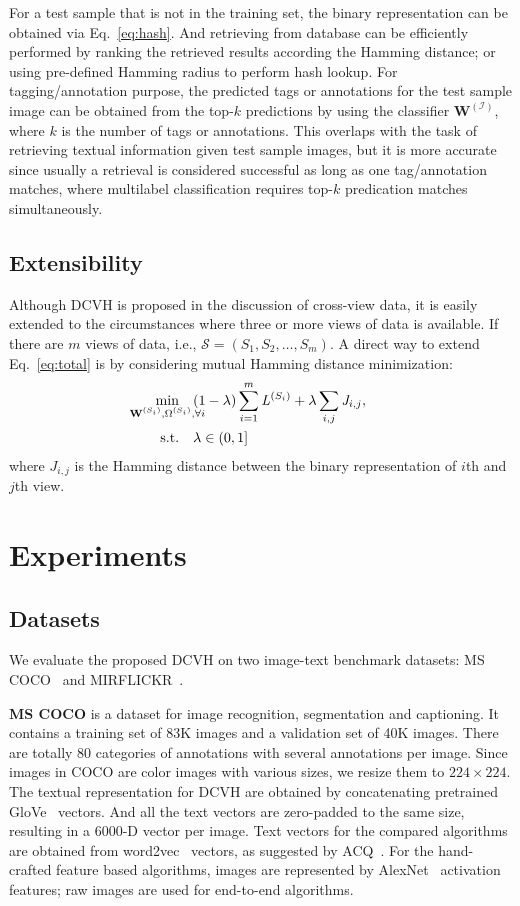 \documentclass[10pt,twocolumn,letterpaper]{article}
\begin{document}
For a test sample that is not in the training set, the binary representation can be obtained via Eq.~\ref{eq:hash}. And retrieving from database can be efficiently performed by ranking the retrieved results according the Hamming distance; or using pre-defined Hamming radius to perform hash lookup. For tagging/annotation purpose, the predicted tags or annotations for the test sample image can be obtained from the top-$k$ predictions by using the classifier $\mathbf{W}^{(\mathcal{I})}$, where $k$ is the number of tags or annotations. This overlaps with the task of retrieving textual information given test sample images, but it is more accurate since usually a retrieval is considered successful as long as one tag/annotation matches, where multilabel classification requires top-$k$ predication matches simultaneously.

\subsection{Extensibility}
Although DCVH is proposed in the discussion of cross-view data, it is easily extended to the circumstances where three or more views of data is available. If there are $m$ views of data, i.e., $\mathcal{S} = (S_1, S_2, \ldots, S_m)$. A direct way to extend Eq.~\ref{eq:total} is by considering mutual Hamming distance minimization:
\begin{align}\label{eq:total}
\min_{\mathclap{\mathbf{W}^{(S_i)},\Omega^{(S_i)}, \forall i}}\quad &(1-\lambda)\sum_{i=1}^m\mathit{L}^{(S_i)} + \lambda \sum_{i,j}\mathit{J}_{i,j},\\
\text{s.t.}\quad &\lambda\in (0,1]\nonumber
\end{align}
where $\mathit{J}_{i,j}$ is the Hamming distance between the binary representation of $i$th and $j$th view.

\section{Experiments}\label{sec:exp}
\subsection{Datasets}
We evaluate the proposed DCVH on two image-text benchmark datasets: MS COCO~\cite{Lin2014} and MIRFLICKR~\cite{huiskes08}.

\textbf{MS COCO} is a dataset for image recognition, segmentation and captioning. It contains a training set of 83K images and a validation set of 40K images. There are totally 80 categories of annotations with several annotations per image. Since images in COCO are color images with various sizes, we resize them to $224\times 224$. The textual representation for DCVH are obtained by concatenating pretrained GloVe~\cite{pennington2014glove} vectors. And all the text vectors are zero-padded to the same size, resulting in a 6000-D vector per image. Text vectors for the compared algorithms are obtained from word2vec~\cite{word2vec} vectors, as suggested by ACQ~\cite{acq}. For the hand-crafted feature based algorithms, images are represented by AlexNet~\cite{DBLP:conf/nips/KrizhevskySH12} activation features; raw images are used for end-to-end algorithms.
\end{document}
